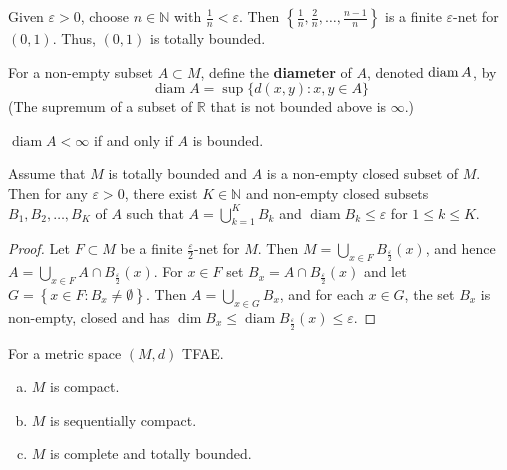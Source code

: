 \documentclass[a4paper]{article}
\begin{document}
\begin{example}
    Given $\varepsilon>0$, choose $n \in \mathbb{N}$ with $\frac{1}{n}<\varepsilon$. Then $\left\{\frac{1}{n}, \frac{2}{n}, \ldots, \frac{n-1}{n}\right\}$ is a finite $\varepsilon$-net for $(0,1)$. Thus, $(0,1)$ is totally bounded.
\end{example}

\begin{definition}
    For a non-empty subset $A \subset M$, define the \textbf{diameter} of $A$, denoted $\operatorname{diam} A$, by
$$
\operatorname{diam} A=\sup \{d(x, y): x, y \in A\}
$$
(The supremum of a subset of $\mathbb{R}$ that is not bounded above is $\infty$.)
\end{definition}

\begin{note}
    $\operatorname{diam} A<\infty$ if and only if $A$ is bounded.
\end{note}

\begin{lemma}\label{lma:totally bounded subset has small finite cover}
    Assume that $M$ is totally bounded and $A$ is a non-empty closed subset of $M$.
Then for any $\varepsilon>0$, there exist $K \in \mathbb{N}$ and non-empty closed subsets
$B_{1}, B_{2}, \ldots, B_{K}$ of $A$ such that $A=\bigcup_{k=1}^{K} B_{k}$ and $\operatorname{diam} B_{k} \leqslant \varepsilon$ for $1 \leqslant k \leqslant K$.
\end{lemma}

\begin{proof}
    Let $F \subset M$ be a finite $\frac{\varepsilon}{2}$-net for $M$. Then $M=\bigcup_{x \in F} B_{\frac{\varepsilon}{2}}(x)$, and hence
$A=\bigcup_{x \in F} A \cap B_{\frac{\varepsilon}{2}}(x)$. For $x \in F$ set $B_{x}=A \cap B_{\frac{\varepsilon}{2}}(x)$ and let
$G=\left\{x \in F: B_{x} \neq \emptyset\right\}$. Then $A=\bigcup_{x \in G} B_{x}$, and for each $x \in G$, the set $B_{x}$ is
non-empty, closed and has $\operatorname{dim} B_{x} \leqslant \operatorname{diam} B_{\frac{\varepsilon}{2}}(x) \leqslant \varepsilon$.
\end{proof}

\begin{theorem}\label{thm:metric space seqcompact tfae}
    For a metric space $(M, d)$ TFAE.
    \begin{enumerate}[(a)]
        \item $M$ is compact.

        \item $M$ is sequentially compact.
        
        \item $M$ is complete and totally bounded.
    \end{enumerate}
\end{theorem}
\end{document}
